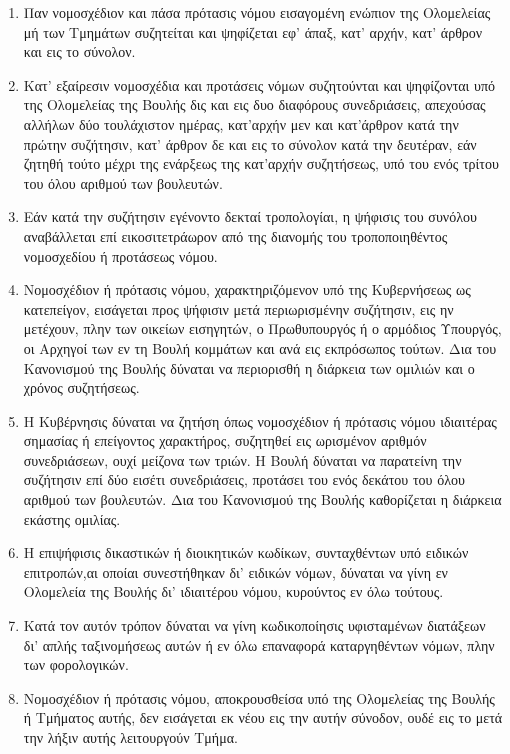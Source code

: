 \documentclass[twoside, a4paper, 10pt]{article}
\begin{document}
\begin{multicols}{2}
\begin{enumerate}
\begin{BigQuote}
\begin{enumerate}
  \item[1.] Παν νομοσχέδιον και πάσα πρότασις νόμου εισαγομένη ενώπιον της Ολομελείας μή των Τμημάτων συζητείται και ψηφίζεται εφ' άπαξ, κατ' αρχήν, κατ' άρθρον και εις το σύνολον.
  \item[2.] Κατ' εξαίρεσιν νομοσχέδια και προτάσεις νόμων συζητούνται και ψηφίζονται υπό της Ολομελείας της Βουλής δις και εις δυο διαφόρους συνεδριάσεις, απεχούσας αλλήλων δύο τουλάχιστον ημέρας, κατ'αρχήν μεν και κατ'άρθρον κατά την πρώτην συζήτησιν, κατ' άρθρον δε και εις το σύνολον κατά την δευτέραν, εάν ζητηθή τούτο μέχρι της ενάρξεως της κατ'αρχήν συζητήσεως, υπό του ενός τρίτου του όλου αριθμού των βουλευτών.
  \item[3.] Εάν κατά την συζήτησιν εγένοντο δεκταί τροπολογίαι, η ψήφισις του συνόλου αναβάλλεται επί εικοσιτετράωρον από της διανομής του τροποποιηθέντος νομοσχεδίου ή προτάσεως νόμου.
  \item[4.] Νομοσχέδιον ή πρότασις νόμου, χαρακτηριζόμενον υπό της Κυβερνήσεως ως κατεπείγον, εισάγεται προς ψήφισιν μετά περιωρισμένην συζήτησιν, εις ην μετέχουν, πλην των οικείων εισηγητών, ο Πρωθυπουργός ή ο αρμόδιος Υπουργός, οι Αρχηγοί των εν τη Βουλή κομμάτων και ανά εις εκπρόσωπος τούτων. Δια του Κανονισμού της Βουλής δύναται να περιορισθή η διάρκεια των ομιλιών και ο χρόνος συζητήσεως.
  \item[5.] Η Κυβέρνησις δύναται να ζητήση  όπως νομοσχέδιον ή πρότασις νόμου ιδιαιτέρας σημασίας ή επείγοντος χαρακτήρος, συζητηθεί εις ωρισμένον αριθμόν συνεδριάσεων, ουχί μείζονα των τριών. Η Βουλή δύναται να παρατείνη την συζήτησιν επί δύο εισέτι συνεδριάσεις, προτάσει του ενός δεκάτου του όλου αριθμού των βουλευτών. Δια του Κανονισμού της Βουλής καθορίζεται η διάρκεια εκάστης ομιλίας.
  \item[6.] Η επιψήφισις δικαστικών ή διοικητικών κωδίκων, συνταχθέντων υπό ειδικών επιτροπών,αι οποίαι συνεστήθηκαν δι' ειδικών νόμων, δύναται να γίνη εν Ολομελεία της Βουλής δι' ιδιαιτέρου νόμου, κυρούντος εν όλω τούτους.
  \item[7.] Κατά τον αυτόν τρόπον δύναται να γίνη κωδικοποίησις υφισταμένων διατάξεων δι' απλής ταξινομήσεως αυτών ή εν όλω επαναφορά καταργηθέντων νόμων, πλην των φορολογικών.
  \item[8.] Νομοσχέδιον ή πρότασις νόμου, αποκρουσθείσα υπό της Ολομελείας της Βουλής ή Τμήματος αυτής, δεν εισάγεται εκ νέου εις την αυτήν σύνοδον, ουδέ εις το μετά την λήξιν αυτής λειτουργούν Τμήμα.
\end{enumerate}


\end{BigQuote}
\end{enumerate}
\end{multicols}
\end{document}
